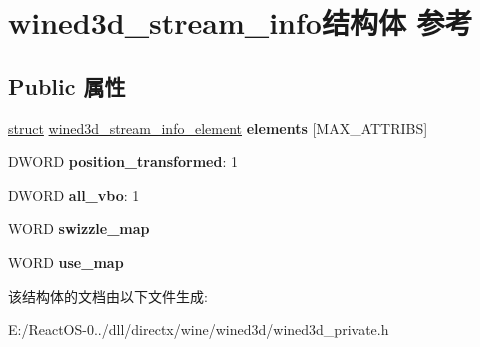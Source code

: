 \hypertarget{structwined3d__stream__info}{}\section{wined3d\+\_\+stream\+\_\+info结构体 参考}
\label{structwined3d__stream__info}
\subsection*{Public 属性}
\begin{DoxyCompactItemize}
\item 
\mbox{\label{structwined3d__stream__info_a508e8dd68f3c95268b8b405186f45a53}} 
\hyperlink{interfacestruct}{struct} \hyperlink{structwined3d__stream__info__element}{wined3d\+\_\+stream\+\_\+info\+\_\+element} {\bfseries elements} \mbox{[}M\+A\+X\+\_\+\+A\+T\+T\+R\+I\+BS\mbox{]}
\item 
\mbox{\label{structwined3d__stream__info_a1912de6f94ce34bd264aa733fde67301}} 
D\+W\+O\+RD {\bfseries position\+\_\+transformed}\+: 1
\item 
\mbox{\label{structwined3d__stream__info_a354eac43fde7cf4f164bf3fe196742ea}} 
D\+W\+O\+RD {\bfseries all\+\_\+vbo}\+: 1
\item 
\mbox{\label{structwined3d__stream__info_ab4c0bc0d07886ae23e18f280521daffa}} 
W\+O\+RD {\bfseries swizzle\+\_\+map}
\item 
\mbox{\label{structwined3d__stream__info_a12b83844c94544298d4f0441e88110d2}} 
W\+O\+RD {\bfseries use\+\_\+map}
\end{DoxyCompactItemize}


该结构体的文档由以下文件生成\+:\begin{DoxyCompactItemize}
\item 
E\+:/\+React\+O\+S-\/0../dll/directx/wine/wined3d/wined3d\+\_\+private.\+h\end{DoxyCompactItemize}
